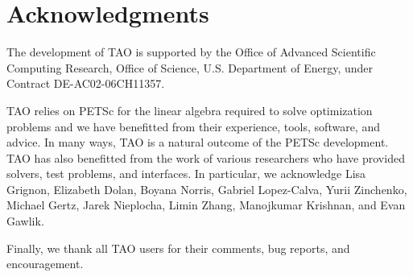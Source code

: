 %
%

\section*{Acknowledgments}

The development of TAO is supported by the Office of Advanced Scientific 
Computing Research, Office of Science, U.S. Department of Energy, under 
Contract DE-AC02-06CH11357. 

TAO relies on PETSc for the linear algebra required to solve optimization
problems and we have benefitted from their experience, tools, software, 
and advice. In many ways, TAO is a natural outcome of the PETSc development.
%
TAO has also benefitted from the work of various researchers who have provided 
solvers, test problems, and interfaces.  In particular, we acknowledge Lisa 
Grignon, Elizabeth Dolan, Boyana Norris, Gabriel Lopez-Calva, Yurii Zinchenko, 
Michael Gertz, Jarek Nieplocha, Limin Zhang, Manojkumar Krishnan, and Evan 
Gawlik.

Finally, we thank all TAO users for their comments, bug reports, and
encouragement.

